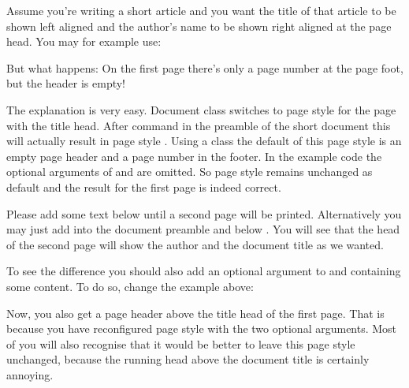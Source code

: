 \begin{Example}
  Assume you're writing a short article and you want the title of that
  article to be shown left aligned and the author's name to be
  shown right aligned at the page head. You may for example use:
  But what happens: On the first page there's only a page number at the page
  foot, but the header is empty!

  The explanation is very easy. Document class  switches to
  page style  for the page with the title head. After command
   in the preamble of the short
  document this will actually result in page style
  . Using a \KOMAScript{} class the default of
  this page style is an empty page header and a page number in the footer. In
  the example code the optional arguments of  and 
  are omitted. So page style  remains
  unchanged as default and the result for the first page is indeed correct.

  Please add some text below  until a second page will be
  printed. Alternatively you may just add
   into the document
  preamble and  below . You
  will see that the head of the second page will show the author and the
  document title as we wanted.

  To see the difference you should also add an optional argument to
   and  containing some content. To do so, change
  the example above:
  Now, you also get a page header above the title head of the first
  page. That is because you have reconfigured page style
   with the two optional arguments. Most of you
  will also recognise that it would be better to leave this page style
  unchanged, because the running head above the document title is certainly
  annoying.
\end{Example}

